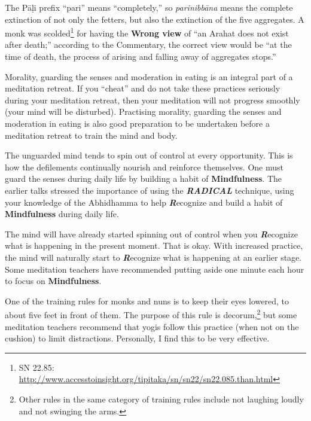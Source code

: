 The Pāḷi prefix “pari” means “completely,” so \textit{parinibbāna} means the complete extinction of not only the fetters, but also the extinction of the five aggregates. A monk was scolded\footnote{SN 22.85: \url{ http://www.accesstoinsight.org/tipitaka/sn/sn22/sn22.085.than.html}} for having the \textbf{Wrong view} of “an Arahat does not exist after death;” according to the Commentary, the correct view would be “at the time of death, the process of arising and falling away of aggregates stops.”


Morality, guarding the senses and moderation in eating is an integral part of a meditation retreat. If you “cheat” and do not take these \color{blue} practices\color{black} seriously during your meditation retreat, then your meditation will not progress smoothly (your mind will be disturbed). Practising morality, guarding the senses and moderation in eating is also good preparation to be undertaken before a meditation retreat to train the mind and body. 


The unguarded mind tends to spin out of control at every opportunity. This is how the defilements continually nourish and reinforce themselves. One must guard the senses during daily life by building a habit of \textbf{Mindfulness}. The earlier talks stressed the importance of using the \textbf{\textit{RADICAL}} technique, using your knowledge of the Abhidhamma to help \textbf{\textit{R}}ecognize and build a habit of \textbf{Mindfulness} during daily life.

The mind will have already started spinning out of control when you \textbf{\textit{R}}ecognize what is happening in the present moment. That is okay. With increased \color{blue} practice\color{black}, the mind will naturally start to \textbf{\textit{R}}ecognize what is happening at an earlier stage. Some meditation teachers have recommended putting aside one minute each hour to focus on \textbf{Mindfulness}. 

One of the training rules for monks and nuns is to keep their eyes lowered, to about five feet in front of them. The purpose of this rule is decorum,\footnote{Other rules in the same category of training rules include not laughing loudly and not swinging the arms.} but some meditation teachers recommend that yogis follow this \color{blue} practice\color{black} (when not on the cushion) to limit distractions. Personally, I find this to be very effective.
